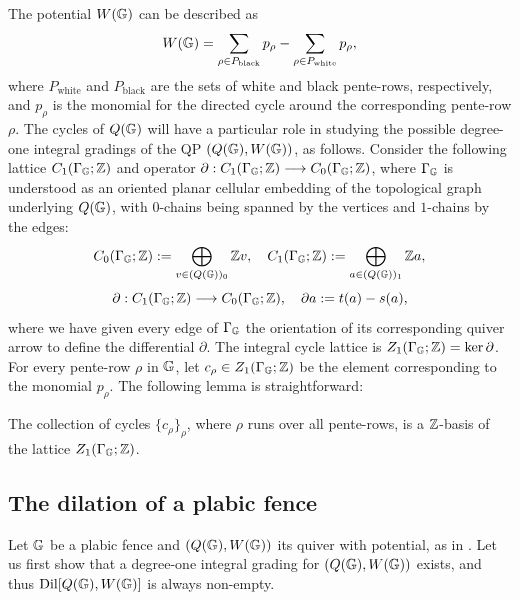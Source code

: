 The potential $W(\mathbb G)$ can be described as
\[
W(\mathbb G)=\sum_{\rho\in P_{\mathrm{black}}}p_\rho
-
\sum_{\rho\in P_{\mathrm{white}}}p_\rho,
\]
where $P_{\mathrm{white}}$ and $P_{\mathrm{black}}$ are the sets of white and black pente-rows, respectively, and $p_\rho$ is the monomial for the directed cycle around the corresponding pente-row $\rho$. The cycles of $Q(\mathbb G)$ will have a particular role in studying the possible degree-one integral gradings of the QP $(Q(\mathbb G),W(\mathbb G))$, as follows. Consider the following lattice $C_1(\Gamma_\mathbb G;\mathbb Z)$ and operator $\partial:C_1(\Gamma_\mathbb G;\mathbb Z)\longrightarrow C_0(\Gamma_\mathbb G;\mathbb Z)$, where $\Gamma_\mathbb G$ is understood as an oriented planar cellular embedding of the topological graph underlying $Q(\mathbb G)$, with $0$-chains being spanned by the vertices and $1$-chains by the edges:
$$C_0(\Gamma_\mathbb G;\mathbb Z):=\bigoplus_{v\in(Q(\mathbb G))_0}\mathbb Z v,\quad C_1(\Gamma_\mathbb G;\mathbb Z):=\bigoplus_{a\in(Q(\mathbb G))_1}\mathbb Z a,$$
$$\partial:C_1(\Gamma_\mathbb G;\mathbb Z)\longrightarrow C_0(\Gamma_\mathbb G;\mathbb Z),\quad \partial a:=t(a)-s(a),$$
where we have given every edge of $\Gamma_\mathbb G$ the orientation of its corresponding quiver arrow to define the differential $\partial$. The integral cycle lattice is $Z_1(\Gamma_\mathbb G;\mathbb Z)=\ker\partial$. For every pente-row $\rho$ in $\mathbb G$, let $c_\rho\in Z_1(\Gamma_\mathbb G;\mathbb Z)$ be the element corresponding to the monomial $p_\rho$. The following lemma is straightforward:

\begin{lemma}\label{lem:face-basis}
The collection of cycles $\{c_\rho\}_\rho$, where $\rho$ runs over all pente-rows, is a $\mathbb Z$-basis of the lattice $Z_1(\Gamma_\mathbb G;\mathbb Z)$.
\end{lemma}

\subsection{The dilation of a plabic fence}\label{ssec:dilation_plabic_fence} Let $\mathbb G$ be a plabic fence and $(Q(\mathbb G),W(\mathbb G))$ its quiver with potential, as in . Let us first show that a degree-one integral grading for $(Q(\mathbb G),W(\mathbb G))$ exists, and thus $\operatorname{Dil}[Q(\mathbb G),W(\mathbb G)]$ is always non-empty.

